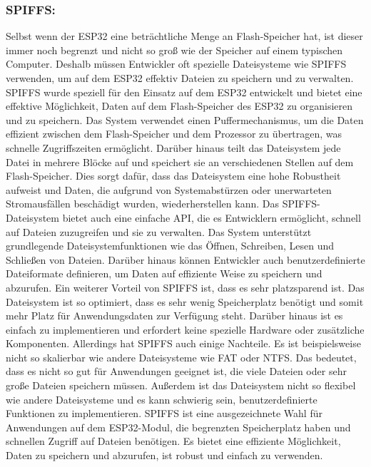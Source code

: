 \subsubsection*{SPIFFS:}
Selbst wenn der ESP32 eine beträchtliche Menge an Flash-Speicher hat, ist dieser immer noch begrenzt und nicht so groß wie der Speicher auf einem typischen Computer. 
Deshalb müssen Entwickler oft spezielle Dateisysteme wie SPIFFS verwenden, um auf dem ESP32 effektiv Dateien zu speichern und zu verwalten.
SPIFFS wurde speziell für den Einsatz auf dem ESP32 entwickelt und bietet eine effektive Möglichkeit, Daten auf dem Flash-Speicher des ESP32 zu organisieren und zu speichern. 
Das System verwendet einen Puffermechanismus, um die Daten effizient zwischen dem Flash-Speicher und dem Prozessor zu übertragen, was schnelle Zugriffszeiten ermöglicht. 
Darüber hinaus teilt das Dateisystem jede Datei in mehrere Blöcke auf und speichert sie an verschiedenen Stellen auf dem Flash-Speicher. 
Dies sorgt dafür, dass das Dateisystem eine hohe Robustheit aufweist und Daten, die aufgrund von Systemabstürzen oder unerwarteten Stromausfällen beschädigt wurden, wiederherstellen kann.
Das SPIFFS-Dateisystem bietet auch eine einfache API, die es Entwicklern ermöglicht, schnell auf Dateien zuzugreifen und sie zu verwalten. 
Das System unterstützt grundlegende Dateisystemfunktionen wie das Öffnen, Schreiben, Lesen und Schließen von Dateien. 
Darüber hinaus können Entwickler auch benutzerdefinierte Dateiformate definieren, um Daten auf effiziente Weise zu speichern und abzurufen.
Ein weiterer Vorteil von SPIFFS ist, dass es sehr platzsparend ist. 
Das Dateisystem ist so optimiert, dass es sehr wenig Speicherplatz benötigt und somit mehr Platz für Anwendungsdaten zur Verfügung steht. 
Darüber hinaus ist es einfach zu implementieren und erfordert keine spezielle Hardware oder zusätzliche Komponenten.
Allerdings hat SPIFFS auch einige Nachteile. Es ist beispielsweise nicht so skalierbar wie andere Dateisysteme wie FAT oder NTFS. 
Das bedeutet, dass es nicht so gut für Anwendungen geeignet ist, die viele Dateien oder sehr große Dateien speichern müssen. 
Außerdem ist das Dateisystem nicht so flexibel wie andere Dateisysteme und es kann schwierig sein, benutzerdefinierte Funktionen zu implementieren.
SPIFFS ist eine ausgezeichnete Wahl für Anwendungen auf dem ESP32-Modul, die begrenzten Speicherplatz haben und schnellen Zugriff auf Dateien benötigen. 
Es bietet eine effiziente Möglichkeit, Daten zu speichern und abzurufen, ist robust und einfach zu verwenden.













